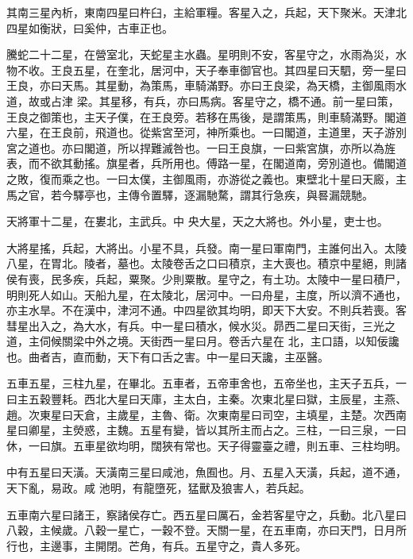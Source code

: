 \begin{pinyinscope}
 其南三星內析，東南四星曰杵臼，主給軍糧。客星入之，兵起，天下聚米。天津北四星如衡狀，曰奚仲，古車正也。



 騰蛇二十二星，在營室北，天蛇星主水蟲。星明則不安，客星守之，水雨為災，水物不收。王良五星，在奎北，居河中，天子奉車御官也。其四星曰天駟，旁一星曰王良，亦曰天馬。其星動，為策馬，車騎滿野。亦曰王良梁，為天橋，主御風雨水道，故或占津
 梁。其星移，有兵，亦曰馬病。客星守之，橋不通。前一星曰策，王良之御策也，主天子僕，在王良旁。若移在馬後，是謂策馬，則車騎滿野。閣道六星，在王良前，飛道也。從紫宮至河，神所乘也。一曰閣道，主道里，天子游別宮之道也。亦曰閣道，所以捍難滅咎也。一曰王良旗，一曰紫宮旗，亦所以為旌表，而不欲其動搖。旗星者，兵所用也。傅路一星，在閣道南，旁別道也。備閣道之敗，復而乘之也。一曰太僕，主御風雨，亦游從之義也。東壁北十星曰天廄，主馬之官，若今驛亭也，主傳令置驛，逐漏馳騖，謂其行急疾，與晷漏競馳。



 天將軍十二星，在婁北，主武兵。中
 央大星，天之大將也。外小星，吏士也。



 大將星搖，兵起，大將出。小星不具，兵發。南一星曰軍南門，主誰何出入。太陵八星，在胃北。陵者，墓也。太陵卷舌之口曰積京，主大喪也。積京中星絕，則諸侯有喪，民多疾，兵起，粟聚。少則粟散。星守之，有土功。太陵中一星曰積尸，明則死人如山。天船九星，在太陵北，居河中。一曰舟星，主度，所以濟不通也，亦主水旱。不在漢中，津河不通。中四星欲其均明，即天下大安。不則兵若喪。客彗星出入之，為大水，有兵。中一星曰積水，候水災。昴西二星曰天街，三光之道，主伺候關梁中外之境。天街西一星曰月。卷舌六星在
 北，主口語，以知佞讒也。曲者吉，直而動，天下有口舌之害。中一星曰天讒，主巫醫。



 五車五星，三柱九星，在畢北。五車者，五帝車舍也，五帝坐也，主天子五兵，一曰主五穀豐耗。西北大星曰天庫，主太白，主秦。次東北星曰獄，主辰星，主燕、趙。次東星曰天倉，主歲星，主魯、衛。次東南星曰司空，主填星，主楚。次西南星曰卿星，主熒惑，主魏。五星有變，皆以其所主而占之。三柱，一曰三泉，一曰休，一曰旗。五車星欲均明，闊狹有常也。天子得靈臺之禮，則五車、三柱均明。



 中有五星曰天潢。天潢南三星曰咸池，魚囿也。月、五星入天潢，兵起，道不通，天下亂，易政。咸
 池明，有龍墮死，猛獸及狼害人，若兵起。



 五車南六星曰諸王，察諸侯存亡。西五星曰厲石，金若客星守之，兵動。北八星曰八穀，主候歲。八穀一星亡，一穀不登。天關一星，在五車南，亦曰天門，日月所行也，主邊事，主開閉。芒角，有兵。五星守之，貴人多死。




\end{pinyinscope}
